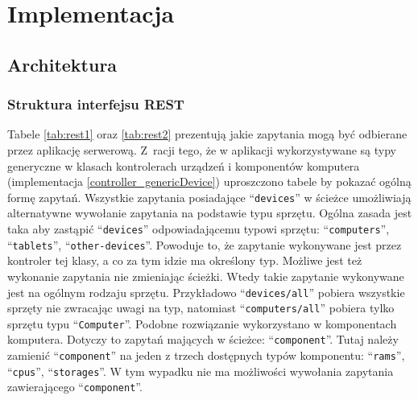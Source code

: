 \chapter{Implementacja}

\section{Architektura}


\subsection{Struktura interfejsu REST}
Tabele \ref{tab:rest1} oraz \ref{tab:rest2} prezentują jakie zapytania mogą być odbierane przez aplikację serwerową. Z~racji tego, że w aplikacji wykorzystywane są typy generyczne w klasach kontrolerach urządzeń i komponentów komputera (implementacja \ref{controller_genericDevice}) uproszczono tabele by pokazać ogólną formę zapytań. Wszystkie zapytania posiadające "`\texttt{devices}"' w ścieżce umożliwiają alternatywne wywołanie zapytania na podstawie typu sprzętu. Ogólna zasada jest taka aby zastąpić "`\texttt{devices}"' odpowiadającemu typowi sprzętu: "`\texttt{computers}"', "`\texttt{tablets}"', "`\texttt{other-devices}"'. Powoduje to, że zapytanie wykonywane jest przez kontroler tej klasy, a co za tym idzie ma określony typ. Możliwe jest też wykonanie zapytania nie zmieniając ścieżki. Wtedy takie zapytanie wykonywane jest na ogólnym rodzaju sprzętu. Przykładowo "`\texttt{devices/all}"' pobiera wszystkie sprzęty nie zwracając uwagi na typ, natomiast "`\texttt{computers/all}"' pobiera tylko sprzętu typu "`\texttt{Computer}"'. Podobne rozwiązanie wykorzystano w komponentach komputera. Dotyczy to zapytań mających w ścieżce: "`\texttt{component}"'. Tutaj należy zamienić "`\texttt{component}"' na jeden z trzech dostępnych typów komponentu: "`\texttt{rams}"', "`\texttt{cpus}"', "`\texttt{storages}"'. W tym wypadku nie ma możliwości wywołania zapytania zawierającego "`\texttt{component}"'.

